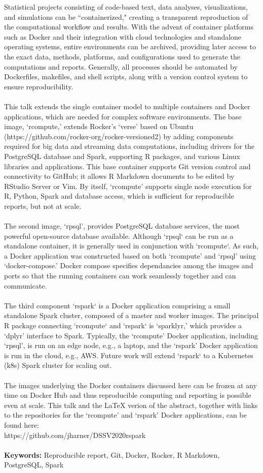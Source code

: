 Statistical projects consisting of code-based text, data analyses, visualizations, and simulations can be ``containerized," creating a transparent reproduction of the computational workflow and results. With the advent of container platforms such as Docker and their integration with cloud technologies and standalone operating systems, entire environments can be archived, providing later access to the exact data, methods, platforms, and configurations used to generate the computations and reports. Generally, all processes should be automated by Dockerfiles, makefiles, and shell scripts, along with a version control system to ensure reproducibility.\\
\\
This talk extends the single container model to multiple containers and Docker applications, which are needed for complex software environments. The base image, `rcompute,' extends Rocker's `verse' based on Ubuntu (https://github.com/rocker-org/rocker-versioned2) by adding components required for big data and streaming data computations, including drivers for the PostgreSQL database and Spark, supporting R packages, and various Linux libraries and applications. This base container supports Git version control and connectivity to GitHub; it allows R Markdown documents to be edited by RStudio Server or Vim. By itself, `rcompute' supports single node execution for R, Python, Spark and database access, which is sufficient for reproducible reports, but not at scale.\\
\\
The second image, `rpsql', provides PostgreSQL database services, the most powerful open-source database available. Although `rpsql` can be run as a standalone container, it is generally used in conjunction with `rcompute`. As such, a Docker application was constructed based on both `rcompute' and `rpsql' using `docker-compose.' Docker compose specifies dependancies among the images and ports so that the running containers can work seamlessly together and can communicate.\\
\\
The third component `rspark` is a Docker application comprising a small standalone Spark cluster, composed of a master and worker images. The principal R package connecting `rcompute` and `rspark` is `sparklyr,' which provides a `dplyr' interface to Spark. Typically, the `rcompute' Docker application, including `rpsql', is run on an edge node, e.g., a laptop, and the `rspark' Docker application is run in the cloud, e.g., AWS. Future work will extend `rspark` to a Kubernetes (k8s) Spark cluster for scaling out.\\
\\
The images underlying the Docker containers discussed here can be frozen at any time on Docker Hub and thus reproducible computing and reporting is possible even at scale. This talk and the LaTeX verion of the abstract, together with links to the repositories for the `rcompute' and `rspark' Docker applications, can be found here:\\ https://github.com/jharner/DSSV2020rspark\\
\\
\textbf{Keywords:} Reproducible report, Git, Docker, Rocker, R Markdown, PostgreSQL, Spark


